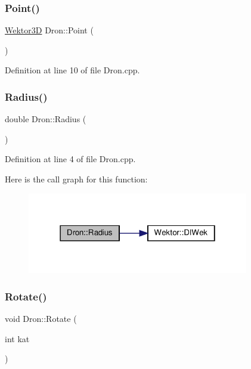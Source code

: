 \subsubsection{\texorpdfstring{Point()}{Point()}}
{\footnotesize\ttfamily \hyperlink{_wektor3_d_8hh_ac353a272b38b4ad342f7181ad7bdb91a}{Wektor3D} Dron\+::\+Point (\begin{DoxyParamCaption}{ }\end{DoxyParamCaption})}



Definition at line 10 of file Dron.\+cpp.

\mbox{\label{class_dron_a3d1518d64638aaa98519d240b6455c8c}} 
\subsubsection{\texorpdfstring{Radius()}{Radius()}}
{\footnotesize\ttfamily double Dron\+::\+Radius (\begin{DoxyParamCaption}{ }\end{DoxyParamCaption})}



Definition at line 4 of file Dron.\+cpp.

Here is the call graph for this function\+:
\nopagebreak
\begin{figure}[H]
\begin{center}
\leavevmode
\includegraphics[width=274pt]{class_dron_a3d1518d64638aaa98519d240b6455c8c_cgraph}
\end{center}
\end{figure}
\mbox{\label{class_dron_ae59a8da00fb889c8f97ae08b21a184f9}} 
\subsubsection{\texorpdfstring{Rotate()}{Rotate()}}
{\footnotesize\ttfamily void Dron\+::\+Rotate (\begin{DoxyParamCaption}\item[{int}]{kat }\end{DoxyParamCaption})}



